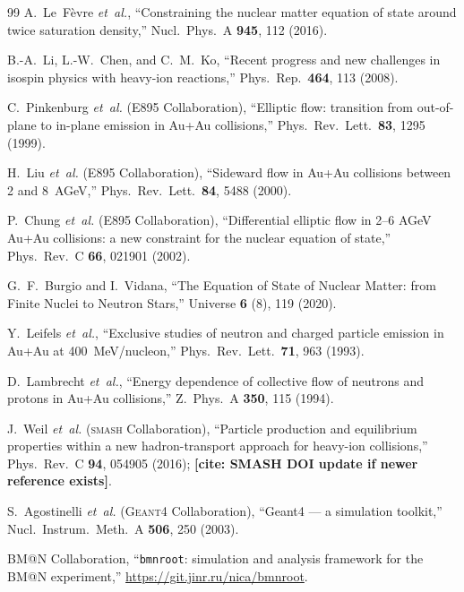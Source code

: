 \documentclass[aps,prc,twocolumn,superscriptaddress,showpacs,%
               nofootinbib,floatfix,longbibliography]{revtex4-2}
\newcommand{\CITENEEDED}[1]{{\color{red}\textbf{[cite: #1]}}}
\newcommand{\SMASH}{\textsc{smash}}
\newcommand{\GEANT}{\textsc{Geant4}}
\begin{document}
\begin{thebibliography}{99}
  A.~Le~F\`evre \emph{et~al.},
  ``Constraining the nuclear matter equation of state around twice
   saturation density,''
  Nucl.~Phys.~A \textbf{945}, 112 (2016).

  B.-A.~Li, L.-W.~Chen, and C.~M.~Ko,
  ``Recent progress and new challenges in isospin physics with
   heavy-ion reactions,''
  Phys.~Rep.~\textbf{464}, 113 (2008).

  C.~Pinkenburg \emph{et~al.} (E895 Collaboration),
  ``Elliptic flow: transition from out-of-plane to in-plane emission
   in Au+Au collisions,''
  Phys.~Rev.~Lett.~\textbf{83}, 1295 (1999).

  H.~Liu \emph{et~al.} (E895 Collaboration),
  ``Sideward flow in Au+Au collisions between 2 and 8~AGeV,''
  Phys.~Rev.~Lett.~\textbf{84}, 5488 (2000).

  P.~Chung \emph{et~al.} (E895 Collaboration),
  ``Differential elliptic flow in 2--6 AGeV Au+Au collisions: a new
   constraint for the nuclear equation of state,''
  Phys.~Rev.~C \textbf{66}, 021901 (2002).

  G.~F.~Burgio and I.~Vidana,
  ``The Equation of State of Nuclear Matter: from Finite Nuclei to
   Neutron Stars,''
  Universe \textbf{6} (8), 119 (2020).

  Y.~Leifels \emph{et~al.},
  ``Exclusive studies of neutron and charged particle emission in
   Au+Au at 400~MeV/nucleon,''
  Phys.~Rev.~Lett.~\textbf{71}, 963 (1993).

  D.~Lambrecht \emph{et~al.},
  ``Energy dependence of collective flow of neutrons and protons in
   Au+Au collisions,''
  Z.~Phys.~A \textbf{350}, 115 (1994).

  J.~Weil \emph{et~al.} (\SMASH{} Collaboration),
  ``Particle production and equilibrium properties within a new
   hadron-transport approach for heavy-ion collisions,''
  Phys.~Rev.~C \textbf{94}, 054905 (2016);
  \CITENEEDED{SMASH DOI update if newer reference exists}.

  S.~Agostinelli \emph{et~al.} (\GEANT{} Collaboration),
  ``Geant4 --- a simulation toolkit,''
  Nucl.~Instrum.~Meth.~A \textbf{506}, 250 (2003).

  BM@N Collaboration,
  ``\texttt{bmnroot}: simulation and analysis framework for the BM@N
   experiment,''
  \url{https://git.jinr.ru/nica/bmnroot}.


\end{thebibliography}
\end{document}
